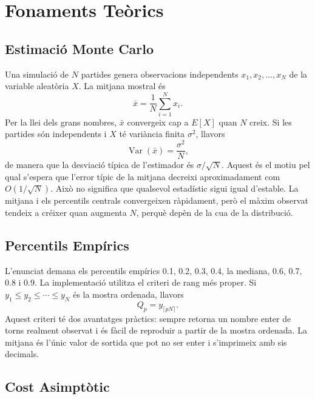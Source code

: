 \documentclass[conference,compsoc]{IEEEtran}
\begin{document}
\section{Fonaments Teòrics}

\subsection{Estimació Monte Carlo}

Una simulació de $N$ partides genera observacions independents
$x_1,x_2,\ldots,x_N$ de la variable aleatòria $X$. La mitjana mostral és
\begin{equation}
\label{eq:mitjana}
\bar{x}=\frac{1}{N}\sum_{i=1}^{N}x_i.
\end{equation}
Per la llei dels grans nombres, $\bar{x}$ convergeix cap a $E[X]$ quan $N$ creix.
Si les partides són independents i $X$ té variància finita $\sigma^2$, llavors
\begin{equation}
\label{eq:error-mitjana}
\operatorname{Var}(\bar{x}) = \frac{\sigma^2}{N},
\end{equation}
de manera que la desviació típica de l'estimador és $\sigma/\sqrt{N}$.
Aquest és el motiu pel qual s'espera que l'error típic
de la mitjana decreixi aproximadament com $O(1/\sqrt{N})$. Això no significa que
qualsevol estadístic sigui igual d'estable. La mitjana i els percentils centrals
convergeixen ràpidament, però el màxim observat tendeix a créixer quan augmenta
$N$, perquè depèn de la cua de la distribució.

\subsection{Percentils Empírics}

L'enunciat demana els percentils empírics 0.1, 0.2, 0.3, 0.4, la mediana, 0.6,
0.7, 0.8 i 0.9. La implementació utilitza el criteri de rang més proper. Si
$y_1\leq y_2\leq\cdots\leq y_N$ és la mostra ordenada, llavors
\begin{equation}
\label{eq:percentil}
Q_p = y_{\lceil pN \rceil}.
\end{equation}
Aquest criteri té dos avantatges pràctics: sempre retorna un nombre enter de torns
realment observat i és fàcil de reproduir a partir de la mostra ordenada. La
mitjana és l'únic valor de sortida que pot no ser enter i s'imprimeix amb sis
decimals.

\subsection{Cost Asimptòtic}
\end{document}
